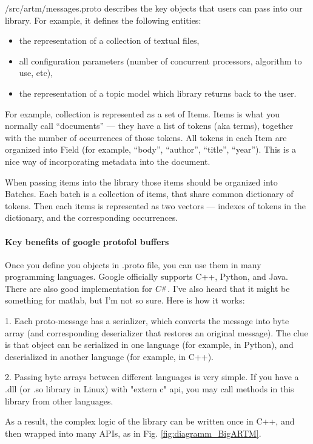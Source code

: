 \documentclass[11pt,a4paper,twoside]{report}
\newcommand{\Csharp}{%
  {\settoheight{\dimen0}{C}C\kern-.05em \resizebox{!}{\dimen0}{\raisebox{\depth}{\#}}}}
\begin{document}
/src/artm/messages.proto describes the key objects that users can pass into our library.
For example, it defines the following entities:
\begin{itemize}
    \item the representation of a collection of textual files,
    \item all configuration parameters (number of concurrent processors, algorithm to use, etc),
    \item the representation of a topic model which library returns back to the user.
 \end{itemize}

For example, collection is represented as a set of Items.
Items is what you normally call ``documents'' --- they have a list of tokens (aka terms),
together with the number of occurrences of those tokens.
All tokens in each Item are organized into Field (for example, ``body'', ``author'', ``title'', ``year'').
This is a nice way of incorporating metadata into the document.

When passing items into the library those items should be organized into Batches.
Each batch is a collection of items, that share common dictionary of tokens.
Then each items is represented as two vectors --- indexes of tokens in the dictionary,
and the corresponding occurrences.

\paragraph{Key benefits of google protofol buffers}

Once you define you objects in .proto file, you can use them in many programming languages.
Google officially supports C++, Python, and Java. There are also good implementation for $\Csharp$.
I've also heard that it might be something for matlab, but I'm not so sure. Here is how it works:

1. Each proto-message has a serializer, which converts the message into byte array
(and corresponding deserializer that restores an original message).
The clue is that object can be serialized in one language (for example, in Python),
and deserialized in another language (for example, in C++).

2. Passing byte arrays between different languages is very simple.
If you have a .dll (or .so library in Linux) with "extern c" api,
you may call methods in this library from other languages.

As a result, the complex logic of the library can be written once in C++,
and then wrapped into many APIs, as in Fig. \ref{fig:diagramm_BigARTM}.
\end{document}
